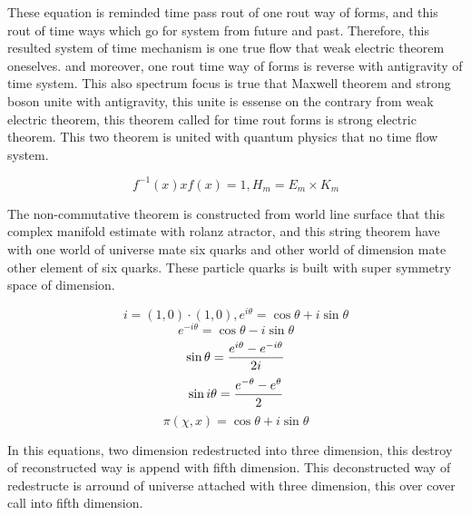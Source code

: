 \documentclass{jsarticle}
\begin{document}
   These equation is reminded time pass rout of one rout way of forms,
   and this rout of time ways which go for system from future and past.
   Therefore, this resulted system of time mechanism is one true flow
   that weak electric theorem oneselves.
   and moreover, one rout time way of forms is reverse with antigravity of
   time system. This also spectrum focus is true that Maxwell theorem and
   strong boson unite with antigravity, this unite is essense on the contrary
   from weak electric theorem, this theorem called for time rout forms is
   strong electric theorem.
   This two theorem is united with quantum physics that no time flow system.

   $$ f^{-1}(x)xf(x) = 1,H_m = E_m \times K_m $$


   The non-commutative theorem is constructed from world line surface that
   this complex manifold estimate with rolanz atractor, and this string
   theorem have with one world of universe mate six quarks and other world of
   dimension mate other element of six quarks.
   These particle quarks is built with super symmetry space of dimension.

   $$ i = (1,0)\cdot (1,0), e^{i\theta} = \cos \theta + i \sin \theta $$
   $$ e^{-i \theta} = \cos \theta - i\sin \theta $$
   $$ \sin \theta = {e^{i \theta} - e^{-i \theta} \over 2i} $$
   $$ \sin i \theta = {e^{-\theta} - e^{\theta} \over 2} $$
   $$ \pi (\chi,x) = \cos \theta + i \sin \theta $$

   In this equations, two dimension redestructed into three dimension,
   this destroy of reconstructed way is append with fifth dimension.
   This deconstructed way of redestructe is arround of universe attached
   with three dimension, this over cover call into fifth dimension.
\end{document}
